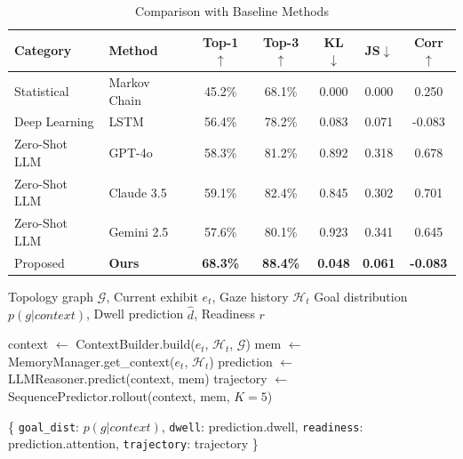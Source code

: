 \begin{table}[h]
\centering
\caption{Comparison with Baseline Methods}
\begin{tabular}{llccccc}
\toprule
\textbf{Category} & \textbf{Method} & \textbf{Top-1$\uparrow$} & \textbf{Top-3$\uparrow$} & \textbf{KL$\downarrow$} & \textbf{JS$\downarrow$} & \textbf{Corr$\uparrow$} \\
\midrule
Statistical & Markov Chain & 45.2\% & 68.1\% & 0.000 & 0.000 & 0.250 \\
Deep Learning & LSTM & 56.4\% & 78.2\% & 0.083 & 0.071 & -0.083 \\
Zero-Shot LLM & GPT-4o & 58.3\% & 81.2\% & 0.892 & 0.318 & 0.678 \\
Zero-Shot LLM & Claude 3.5 & 59.1\% & 82.4\% & 0.845 & 0.302 & 0.701 \\
Zero-Shot LLM & Gemini 2.5 & 57.6\% & 80.1\% & 0.923 & 0.341 & 0.645 \\
\midrule
\rowcolor{green!10}
Proposed & \textbf{Ours} & \textbf{68.3\%} & \textbf{88.4\%} & \textbf{0.048} & \textbf{0.061} & \textbf{-0.083} \\
\bottomrule
\end{tabular}
\label{tab:baselines}
\end{table}

\begin{algorithm}[h]
\caption{Robot Interface: Goal and Timing Prediction}
\begin{algorithmic}[1]
\REQUIRE Topology graph $\mathcal{G}$, Current exhibit $e_t$, Gaze history $\mathcal{H}_t$
\ENSURE Goal distribution $p(g|context)$, Dwell prediction $\hat{d}$, Readiness $r$

\STATE context $\gets$ ContextBuilder.build($e_t$, $\mathcal{H}_t$, $\mathcal{G}$)
\STATE mem $\gets$ MemoryManager.get\_context($e_t$, $\mathcal{H}_t$)
\STATE prediction $\gets$ LLMReasoner.predict(context, mem)
\STATE trajectory $\gets$ SequencePredictor.rollout(context, mem, $K=5$)

\RETURN \{
    \texttt{goal\_dist}: $p(g|context)$,
    \texttt{dwell}: prediction.dwell,
    \texttt{readiness}: prediction.attention,
    \texttt{trajectory}: trajectory
\}
\end{algorithmic}
\end{algorithm}


